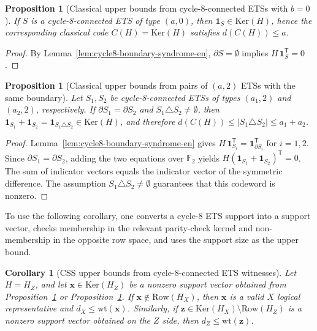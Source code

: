\documentclass[11pt]{article}
\newcommand{\Ftwo}{\mathbb{F}_2}
\newcommand{\Ker}{\mathrm{Ker}}
\newcommand{\Row}{\mathrm{Row}}
\newcommand{\wt}{\mathrm{wt}}
\newcommand{\markededit}[1]{#1}
\newcommand{\vect}[1]{\bm{#1}}
\newcommand{\vx}{\vect{x}}
\newcommand{\vz}{\vect{z}}
\theoremstyle{uprightthm}
\newtheorem{proposition}[theorem]{Proposition}
\newtheorem{corollary}[theorem]{Corollary}
\begin{document}
\begin{proposition}[Classical upper bounds from cycle-8-connected ETSs with $b=0$]
\label{prop:cycle8-b0-upper-en}
If $S$ is a cycle-8-connected ETS of type $(a,0)$, then
$\mathbf{1}_S\in\Ker(H)$,
hence the corresponding classical code $C(H)=\Ker(H)$ satisfies $d(C(H))\le a$.
\end{proposition}

\begin{proof}
By Lemma~\ref{lem:cycle8-boundary-syndrome-en},
$\partial S=\emptyset$ implies $H\,\mathbf{1}_S^{\mathsf T}=0$.
\end{proof}

\begin{proposition}[Classical upper bounds from pairs of $(a,2)$ ETSs with the same boundary]
\label{prop:cycle8-b2pair-upper-en}
Let $S_1,S_2$ be cycle-8-connected ETSs of types $(a_1,2)$ and $(a_2,2)$, respectively. If
$\partial S_1=\partial S_2$ and $S_1\triangle S_2\neq\emptyset$,
then
$\mathbf{1}_{S_1}+\mathbf{1}_{S_2}=\mathbf{1}_{S_1\triangle S_2}\in \Ker(H)$,
and therefore $d(C(H))\le |S_1\triangle S_2|\le a_1+a_2$.
\end{proposition}

\begin{proof}
Lemma~\ref{lem:cycle8-boundary-syndrome-en} gives
$H\,\mathbf{1}_{S_i}^{\mathsf T}=\mathbf{1}_{\partial S_i}^{\mathsf T}$ for $i=1,2$.
Since $\partial S_1=\partial S_2$, adding the two equations over $\Ftwo$ yields
$H(\mathbf{1}_{S_1}+\mathbf{1}_{S_2})^{\mathsf T}=0$.
The sum of indicator vectors equals the indicator vector of the symmetric difference. The
assumption $S_1\triangle S_2\neq\emptyset$ guarantees that this codeword is nonzero.
\end{proof}

To use the following corollary, one converts a cycle-8 ETS \markededit{support} into a
support vector, checks membership in the relevant parity-check kernel and
non-membership in the opposite row space, and uses the support size as the
upper bound.

\begin{corollary}[CSS upper bounds from cycle-8-connected ETS witnesses]
\label{cor:cycle8-css-upper-en}
Let $H=H_Z$, and let $\vx\in\Ker(H_Z)$ be a nonzero support vector obtained from Proposition~\ref{prop:cycle8-b0-upper-en} or Proposition~\ref{prop:cycle8-b2pair-upper-en}. If $\vx\notin \Row(H_X)$, then $\vx$ is a valid $X$ logical representative and $d_X\le \wt(\vx)$.
Similarly, if $\vz\in\Ker(H_X)\setminus \Row(H_Z)$ is a nonzero support vector obtained on the $Z$ side, then $d_Z\le \wt(\vz)$.
\end{corollary}
\end{document}

